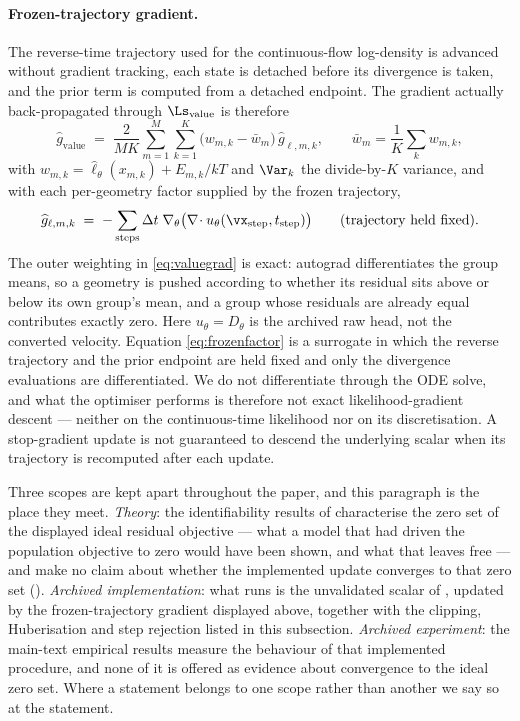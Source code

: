 \paragraph{Frozen-trajectory gradient.} The reverse-time trajectory used for the
continuous-flow log-density is advanced without gradient tracking, each state is
detached before its divergence is taken, and the prior term is computed from a
detached endpoint. The gradient actually back-propagated through
$\Ls_{\mathrm{value}}$ is therefore
\begin{equation}
  \widehat g_{\mathrm{value}}
  \;=\; \frac{2}{MK} \sum_{m=1}^{M} \sum_{k=1}^{K}
        \bigl( w_{m,k} - \bar w_m \bigr)\,
        \widehat g_{\ell,m,k},
  \qquad \bar w_m = \frac{1}{K}\sum_{k} w_{m,k},
  \label{eq:valuegrad}
\end{equation}
with $w_{m,k}=\widehat\ell_\theta(x_{m,k})+E_{m,k}/kT$ and $\Var_k$ the divide-by-$K$ variance, and with
each per-geometry factor supplied by the frozen trajectory,
\begin{equation}
  \widehat g_{\ell,m,k}
  \;=\; -\sum_{\text{steps}} \Delta t \; \nabla_\theta
  \big(\nabla\!\cdot u_\theta(\vx_{\text{step}}, t_{\text{step}})\big)
  \qquad \text{(trajectory held fixed)} .
  \label{eq:frozenfactor}
\end{equation}
The outer weighting in \eqref{eq:valuegrad} is exact: autograd differentiates the group
means, so a geometry is pushed according to whether its residual sits above or below its
own group's mean, and a group whose residuals are already equal contributes exactly zero.
Here $u_\theta=D_\theta$ is the archived raw head, not the converted velocity.
Equation \eqref{eq:frozenfactor} is a surrogate in which the reverse
trajectory and the prior endpoint are held fixed and only the divergence evaluations are
differentiated. We do not differentiate
through the ODE solve, and what the optimiser performs is therefore not exact
likelihood-gradient descent --- neither on the continuous-time likelihood nor on its
discretisation. A stop-gradient update is not guaranteed to descend the underlying
scalar when its trajectory is recomputed after each update.

Three scopes are kept apart throughout the paper, and this paragraph is the place they
meet. \emph{Theory}: the identifiability results of  characterise the
zero set of the displayed ideal residual objective --- what a model that had driven the
population objective to zero would have been shown, and what that leaves free --- and
make no claim about whether the implemented update converges to that zero set
(). \emph{Archived implementation}: what runs is the unvalidated
scalar of , updated by the frozen-trajectory gradient displayed
above, together with the clipping, Huberisation and step rejection listed in this
subsection. \emph{Archived experiment}: the main-text empirical results measure
the behaviour of that implemented procedure, and none of it is offered as evidence about
convergence to the ideal zero set. Where a statement belongs to one scope rather than
another we say so at the statement.

